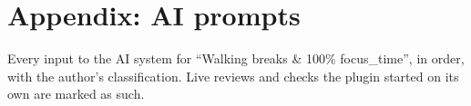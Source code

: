 \section*{Appendix: AI prompts}

Every input to the AI system for “Walking breaks \& 100\% focus\_time”, in order, with the author's classification. Live reviews and checks the plugin started on its own are marked as such.

\begin{enumerate}
\end{enumerate}
